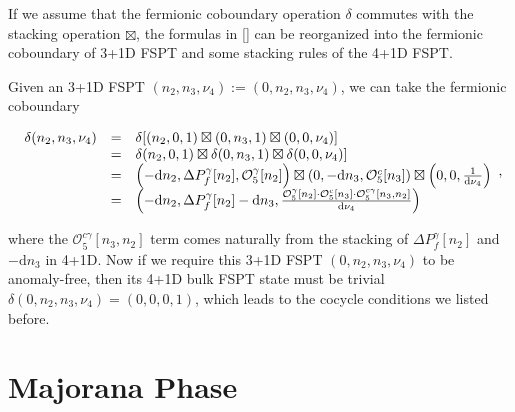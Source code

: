 \documentclass[%
 reprint,
 amsmath,amssymb,
 aps,
prb,
]{revtex4-2}
\begin{document}
If we assume that the fermionic coboundary operation $\delta$ commutes with the stacking operation $\boxtimes$, the formulas in \eqref{} can be reorganized into the fermionic coboundary of 3+1D FSPT and some stacking rules of the 4+1D FSPT.

Given an 3+1D FSPT $(n_2, n_3, \nu_4):= (0, n_2, n_3, \nu_4)$, we can take the fermionic coboundary 
\begin{widetext}
\begin{equation}
\begin{array}{ c c l }
\delta (n_{2} ,n_{3} ,\nu _{4}) & = & \delta [(n_{2} ,0,1) \boxtimes (0,n_{3} ,1) \boxtimes (0, 0, \nu _{4})]\\
& = & \delta (n_{2} ,0,1) \boxtimes \delta (0,n_{3} ,1) \boxtimes \delta (0,0,\nu _{4})]\\
& = & \left(-\mathrm{d} n_{2} ,\Delta P_{f}^{\gamma }[ n_{2}] ,\mathcal{O}_{5}^{\gamma }[ n_{2}]\right) \boxtimes \left(0,-\mathrm{d} n_{3} ,\mathcal{O}_{5}^{c}[ n_{3}]\right) \boxtimes \left(0,0,\frac{1}{\mathrm{d} \nu _{4}}\right)\\
& = & \left(-\mathrm{d} n_{2} ,\Delta P_{f}^{\gamma }[ n_{2}] -\mathrm{d} n_{3} ,\frac{\mathcal{O}_{5}^{\gamma }[ n_{2}] \cdotp \mathcal{O}_{5}^{c}[ n_{3}] \cdotp \mathcal{O}_{5}^{c\gamma }[ n_{3} ,n_{2}]}{\mathrm{d} \nu _{4}}\right)
\end{array},
\end{equation}
\end{widetext}
where the $\mathcal{O}_{5}^{c\gamma }[ n_{3} ,n_{2}]$ term comes naturally from the stacking of $\Delta P_{f}^{\gamma }[ n_{2}]$ and $-\mathrm{d} n_{3}$ in 4+1D.
Now if we require this 3+1D FSPT $(0, n_2, n_3, \nu_4)$ to be anomaly-free, then its 4+1D bulk FSPT state must be trivial $\delta (0, n_{2}, n_{3}, \nu _{4}) = (0,0,0,1)$, which leads to the cocycle conditions we listed before.

\section{\label{ap:Majorana}Majorana Phase}

\nocite{*}

\end{document}
